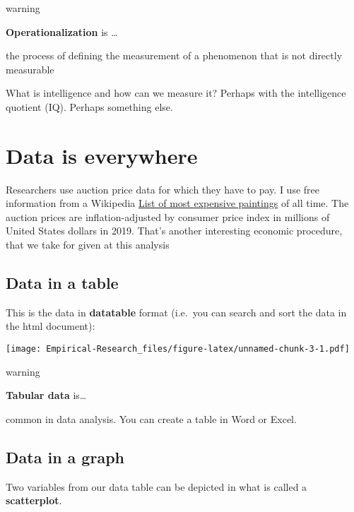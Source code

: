 \documentclass[
]{book}
\begin{document}
\begin{infobox}warning

\textbf{Operationalization} is \ldots{}

the process of defining the measurement of a phenomenon that is not directly measurable

\end{infobox}

What is intelligence and how can we measure it? Perhaps with the intelligence quotient (IQ). Perhaps something else.

\hypertarget{data-is-everywhere}{%
\section{Data is everywhere}\label{data-is-everywhere}}

Researchers use auction price data for which they have to pay. I use free information from a Wikipedia \href{https://en.wikipedia.org/wiki/List_of_most_expensive_paintings}{List of most expensive paintings} of all time. The auction prices are inflation-adjusted by consumer price index in millions of United States dollars in 2019. That's another interesting economic procedure, that we take for given at this analysis

\hypertarget{data-in-a-table}{%
\subsection{Data in a table}\label{data-in-a-table}}

This is the data in \textbf{datatable} format (i.e.~you can search and sort the data in the html document):

\texttt{[image: Empirical-Research\_files/figure-latex/unnamed-chunk-3-1.pdf]}

\begin{infobox}warning

\textbf{Tabular data} is\ldots{}

common in data analysis. You can create a table in Word or Excel.

\end{infobox}

\hypertarget{data-in-a-graph}{%
\subsection{Data in a graph}\label{data-in-a-graph}}

Two variables from our data table can be depicted in what is called a \textbf{scatterplot}.
\end{document}
